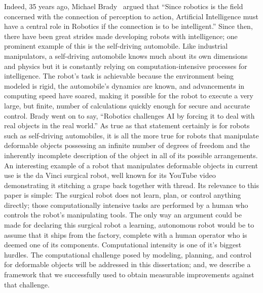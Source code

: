 Indeed, 35 years ago, Michael Brady~\cite{BRADY198579} argued that ``Since robotics is the field concerned with the connection of perception to action, Artificial Intelligence must have a central role in Robotics if the connection is to be intelligent.'' Since then, there have been great strides made developing robots with intelligence; one prominent example of this is the self-driving automobile. Like industrial manipulators, a self-driving automobile knows much about its own dimensions and physics but it is constantly relying on computation-intensive processes for intelligence. The robot's task is achievable because the environment being modeled is rigid, the automobile's dynamics are known, and advancements in computing speed have soared, making it possible for the robot to execute a very large, but finite, number of calculations quickly enough for secure and accurate control. Brady went on to say, ``Robotics challenges AI by forcing it to deal with real objects in the real world.'' As true as that statement certainly is for robots such as self-driving automobiles, it is all the more true for robots that manipulate deformable objects possessing an infinite number of degrees of freedom and the inherently incomplete description of the object in all of its possible arrangements. An interesting example of a robot that manipulates deformable objects in current use is the da Vinci surgical robot, well known for its YouTube video demonstrating it stitching a grape back together with thread. Its relevance to this paper is simple: The surgical robot does not learn, plan, or control anything directly; those computationally intensive tasks are performed by a human who controls the robot's manipulating tools. The only way an argument could be made for declaring this surgical robot a learning, autonomous robot would be to assume that it ships from the factory, complete with a human operator who is deemed one of its components. Computational intensity is one of it's biggest hurdles. The computational challenge posed by modeling, planning, and control for deformable objects will be addressed in this dissertation; and, we describe a framework that we successfully used to obtain measurable improvements against that challenge.

